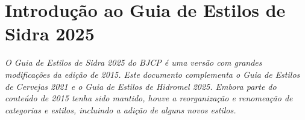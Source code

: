 \section*{Introdução ao Guia de Estilos de Sidra 2025}

\textit{O Guia de Estilos de Sidra 2025 do BJCP é uma versão com grandes modificações da edição de 2015. Este documento complementa o Guia de Estilos de Cervejas 2021 e o Guia de Estilos de Hidromel 2025. Embora parte do conteúdo de 2015 tenha sido mantido, houve a reorganização e renomeação de categorias e estilos, incluindo a adição de alguns novos estilos.}
